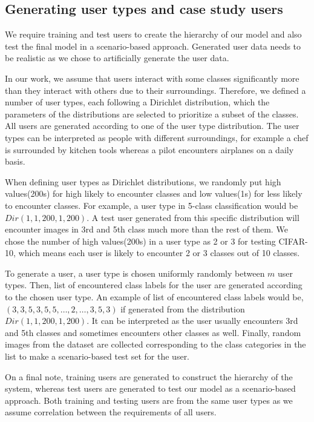 \subsection{Generating user types and case study users}

\label{ssec:genusers}

We require training and test users to create the hierarchy of our model and also test the final model in a scenario-based approach. 
Generated user data needs to be realistic as we chose to artificially generate the user data.

In our work, we assume that users interact with some classes significantly more than they interact with others due to their surroundings. 
Therefore, we defined a number of user types, each following a Dirichlet distribution, 
which the parameters of the distributions are selected to prioritize a subset of the classes. 
All users are generated according to one of the user type distribution. 
The user types can be interpreted as people with different surroundings, 
for example a chef is surrounded by kitchen tools whereas a pilot encounters airplanes on a daily basis.

When defining user types as Dirichlet distributions, we randomly put high values(200s) for high likely to encounter classes and low values(1s) for less likely to encounter classes. For example, a user type in 5-class classification would be $Dir(1,1,200,1,200)$. 
A test user generated from this specific distribution will encounter images in 3rd and 5th class much more than the rest of them. 
We chose the number of high values(200s) in a user type as 2 or 3 for testing CIFAR-10, which means each user is likely to encounter 2 or 3 classes out of 10 classes. 

To generate a user, a user type is chosen uniformly randomly between $m$ user types. 
Then, list of encountered class labels for the user are generated according to the chosen user type. 
An example of list of encountered class labels would be, $(3,3,5,3,5,5,\dots,2,\dots,3,5,3)$ if generated from the distribution $Dir(1,1,200,1,200)$. 
It can be interpreted as the user usually encounters 3rd and 5th classes and sometimes encounters other classes as well.
Finally, random images from the dataset are collected corresponding to the class categories in the list to make a scenario-based test set for the user.

On a final note, training users are generated to construct the hierarchy of the system, whereas test users are generated to test our model as a scenario-based approach. 
Both training and testing users are from the same user types as we assume correlation between the requirements of all users. 

